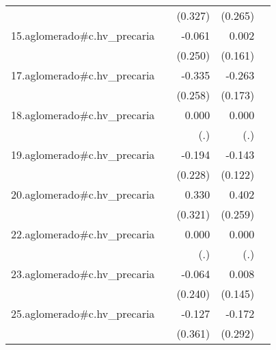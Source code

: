 {\begin{longtable}{l*{4}{D{.}{.}{-1}}}
            &                     &     (0.327)         &     (0.265)         &                     \\
\addlinespace
15.aglomerado#c.hv\_precaria&                     &      -0.061         &       0.002         &                     \\
            &                     &     (0.250)         &     (0.161)         &                     \\
\addlinespace
17.aglomerado#c.hv\_precaria&                     &      -0.335         &      -0.263         &                     \\
            &                     &     (0.258)         &     (0.173)         &                     \\
\addlinespace
18.aglomerado#c.hv\_precaria&                     &       0.000         &       0.000         &                     \\
            &                     &         (.)         &         (.)         &                     \\
\addlinespace
19.aglomerado#c.hv\_precaria&                     &      -0.194         &      -0.143         &                     \\
            &                     &     (0.228)         &     (0.122)         &                     \\
\addlinespace
20.aglomerado#c.hv\_precaria&                     &       0.330         &       0.402         &                     \\
            &                     &     (0.321)         &     (0.259)         &                     \\
\addlinespace
22.aglomerado#c.hv\_precaria&                     &       0.000         &       0.000         &                     \\
            &                     &         (.)         &         (.)         &                     \\
\addlinespace
23.aglomerado#c.hv\_precaria&                     &      -0.064         &       0.008         &                     \\
            &                     &     (0.240)         &     (0.145)         &                     \\
\addlinespace
25.aglomerado#c.hv\_precaria&                     &      -0.127         &      -0.172         &                     \\
            &                     &     (0.361)         &     (0.292)         &                     \\

\end{longtable}}
